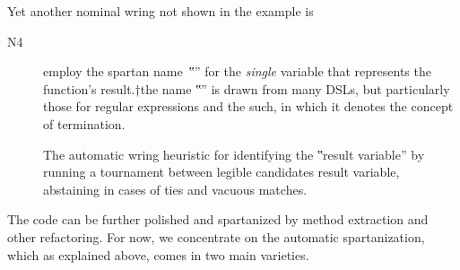 Yet another nominal wring not shown in the example is
\begin{description}
\item[N4] employ the spartan name~‟\cc{\$}” for
  the \emph{single} variable that represents the
  function's result.†{the name ‟\cc{\$}” is drawn from many DSLs, but
    particularly those for regular expressions and the such, in which it denotes
  the concept of termination.}

  The automatic wring heuristic for identifying the ‟result variable”
  by running a tournament between legible candidates result variable,
  abstaining in cases of ties and vacuous matches.
\end{description}

The code can be
further polished and spartanized by method extraction and other refactoring.
For now, we concentrate on the automatic spartanization, which as explained
above, comes in
two main varieties.
